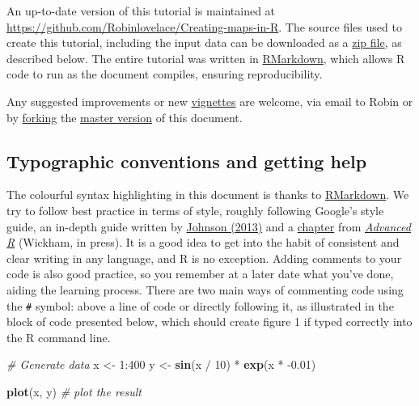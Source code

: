 \documentclass[]{article}
\newenvironment{Shaded}{}{}
\newcommand{\KeywordTok}[1]{\textcolor[rgb]{0.00,0.44,0.13}{\textbf{{#1}}}}
\newcommand{\DecValTok}[1]{\textcolor[rgb]{0.25,0.63,0.44}{{#1}}}
\newcommand{\FloatTok}[1]{\textcolor[rgb]{0.25,0.63,0.44}{{#1}}}
\newcommand{\StringTok}[1]{\textcolor[rgb]{0.25,0.44,0.63}{{#1}}}
\newcommand{\CommentTok}[1]{\textcolor[rgb]{0.38,0.63,0.69}{\textit{{#1}}}}
\newcommand{\NormalTok}[1]{{#1}}
\begin{document}
An up-to-date version of this tutorial is maintained at
\href{https://github.com/Robinlovelace/Creating-maps-in-R/blob/master/intro-spatial-rl.pdf}{\url{https://github.com/Robinlovelace/Creating-maps-in-R}}.
The source files used to create this tutorial, including the input data
can be downloaded as a
\href{https://github.com/Robinlovelace/Creating-maps-in-R/archive/master.zip}{zip
file}, as described below. The entire tutorial was written in
\href{http://rmarkdown.rstudio.com/}{RMarkdown}, which allows R code to
run as the document compiles, ensuring reproducibility.

Any suggested improvements or new
\href{https://github.com/Robinlovelace/Creating-maps-in-R/tree/master/vignettes}{vignettes}
are welcome, via email to Robin or by
\href{https://help.github.com/articles/fork-a-repo}{forking} the
\href{https://github.com/Robinlovelace/Creating-maps-in-R/blob/master/intro-spatial.Rmd}{master
version} of this document.

\subsection{Typographic conventions and getting
help}\label{typographic-conventions-and-getting-help}

The colourful syntax highlighting in this document is thanks to
\href{http://rmarkdown.rstudio.com/}{RMarkdown}. We try to follow best
practice in terms of style, roughly following Google's style guide, an
in-depth guide written by
\href{http://cran.r-project.org/web/packages/rockchalk/vignettes/Rstyle.pdf}{Johnson
(2013)} and a \href{http://adv-r.had.co.nz/Style.html}{chapter} from
\href{http://adv-r.had.co.nz/}{\emph{Advanced R}} (Wickham, in press).
It is a good idea to get into the habit of consistent and clear writing
in any language, and R is no exception. Adding comments to your code is
also good practice, so you remember at a later date what you've done,
aiding the learning process. There are two main ways of commenting code
using the \texttt{\#} symbol: above a line of code or directly following
it, as illustrated in the block of code presented below, which should
create figure 1 if typed correctly into the R command line.

\begin{Shaded}
\begin{Highlighting}[]
\CommentTok{# Generate data}
\NormalTok{x <-}\StringTok{ }\DecValTok{1}\NormalTok{:}\DecValTok{400}
\NormalTok{y <-}\StringTok{ }\KeywordTok{sin}\NormalTok{(x /}\StringTok{ }\DecValTok{10}\NormalTok{) *}\StringTok{ }\KeywordTok{exp}\NormalTok{(x *}\StringTok{ }\NormalTok{-}\FloatTok{0.01}\NormalTok{)}

\KeywordTok{plot}\NormalTok{(x, y) }\CommentTok{# plot the result}
\end{Highlighting}
\end{Shaded}
\end{document}
